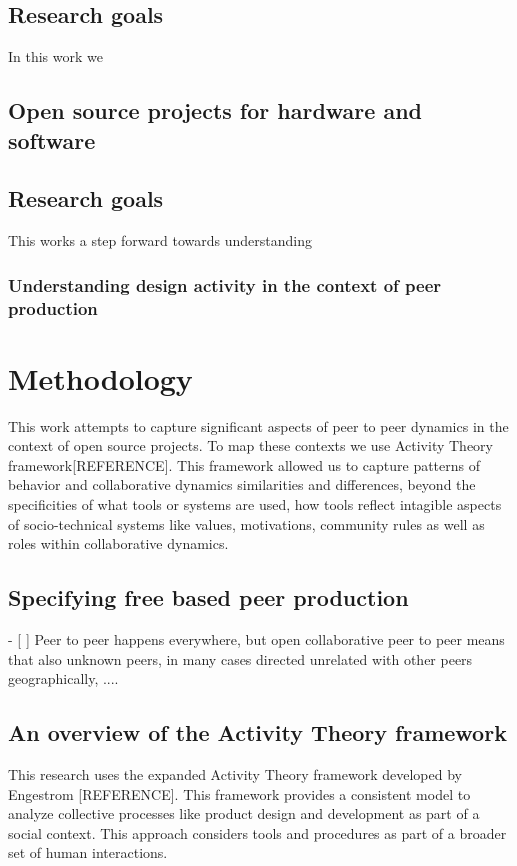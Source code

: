 \documentclass{ICED-Paper}%
\begin{document}
\cite{EmergingProductiveModel}
\bigskip
\subsection{Research goals}
In this work we

\cite{Mozilla_arch}


\subsection{Open source projects for hardware and software}

\subsection{Research goals}
This works a step forward towards understanding


\subsubsection{Understanding design activity in the context of peer production}

\section{Methodology}
This work attempts to capture significant aspects of peer to peer dynamics in the context of open source projects. To map these contexts we use Activity Theory framework[REFERENCE]. This framework allowed us to capture patterns of behavior and collaborative dynamics similarities and differences, beyond the specificities of what tools or systems are used, how tools reflect intagible aspects of socio-technical systems like values, motivations, community rules as well as roles within collaborative dynamics.
\subsection{Specifying free based peer production}
- [ ] Peer to peer happens everywhere, but open collaborative peer to peer means that also unknown peers, in many cases directed unrelated with other peers geographically, ....
\subsection{An overview of  the Activity Theory framework}
This research uses the expanded Activity Theory framework developed by Engestrom [REFERENCE]. This framework provides a consistent model to analyze collective processes like product design and development as part of a social context. This approach considers tools and procedures as part of a broader set of human interactions.
\end{document}
